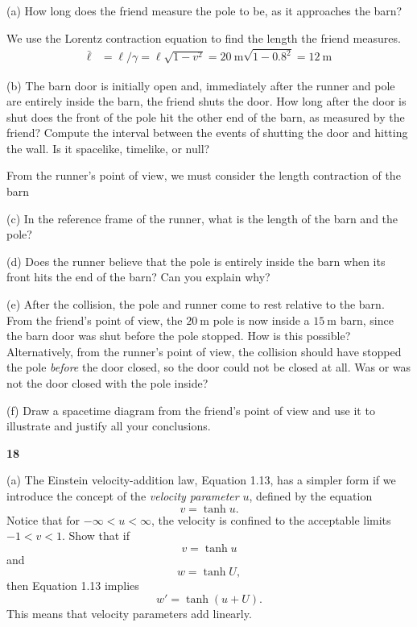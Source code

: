 \documentclass[gr-notes.tex]{subfiles}
\begin{document}
(a) How long does the friend measure the pole to be, as it approaches the barn?

We use the Lorentz contraction equation to find the length the friend measures.
%
\begin{align*}
  \bar\ell &=
  \ell / \gamma =
  \ell \sqrt{ 1 - v^2 } =
  \SI{20}{\meter} \sqrt{ 1 - 0.8^2 } =
  \SI{12}{\meter}
\end{align*}

(b) The barn door is initially open and, immediately after the runner and pole are entirely inside the barn, the friend shuts the door. How long after the door is shut does the front of the pole hit the other end of the barn, as measured by the friend? Compute the interval between the events of shutting the door and hitting the wall. Is it spacelike, timelike, or null?

From the runner's point of view, we must consider the length contraction of the barn

(c) In the reference frame of the runner, what is the length of the barn and the pole?


(d) Does the runner believe that the pole is entirely inside the barn when its front hits the end of the barn? Can you explain why?


(e) After the collision, the pole and runner come to rest relative to the barn. From the friend's point of view, the $\SI{20}{\meter}$ pole is now inside a $\SI{15}{\meter}$ barn, since the barn door was shut before the pole stopped. How is this possible? Alternatively, from the runner's point of view, the collision should have stopped the pole \emph{before} the door closed, so the door could not be closed at all. Was or was not the door closed with the pole inside?


(f) Draw a spacetime diagram from the friend's point of view and use it to illustrate and justify all your conclusions.




\textbf{18}

(a) The Einstein velocity-addition law, Equation 1.13, has a simpler form if we introduce the concept of the \emph{velocity parameter} $u$, defined by the equation
%
\begin{displaymath}
  v = \tanh u.
\end{displaymath}
%
Notice that for $-\infty < u < \infty$, the velocity is confined to the acceptable limits $-1 < v < 1$. Show that if
%
\begin{displaymath}
  v = \tanh u
\end{displaymath}
%
and
%
\begin{displaymath}
  w = \tanh U,
\end{displaymath}
%
then Equation 1.13 implies
%
\begin{displaymath}
  w' = \tanh(u + U).
\end{displaymath}
%
This means that velocity parameters add linearly.
\end{document}
